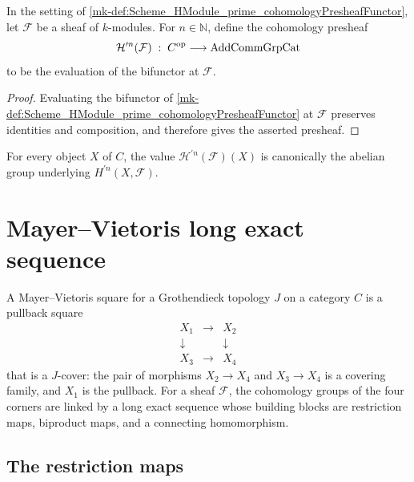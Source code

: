 \begin{definition}\label{mk-def:Scheme_HModule_prime_cohomologyPresheaf}
  \leanok


  In the setting of \ref{mk-def:Scheme_HModule_prime_cohomologyPresheafFunctor}, let \(\mathcal F\) be a sheaf of \(k\)-modules. For \(n \in \mathbb N\), define the cohomology presheaf
  \[
    \mathcal H^{\prime n}(\mathcal F) \;:\; C^{\mathrm{op}} \longrightarrow \mathrm{AddCommGrpCat}
  \]
  to be the evaluation of the bifunctor at \(\mathcal F\).
\end{definition}

\begin{proof}
  \leanok

  Evaluating the bifunctor of \ref{mk-def:Scheme_HModule_prime_cohomologyPresheafFunctor} at \(\mathcal F\) preserves identities and composition, and therefore gives the asserted presheaf.
\end{proof}

\begin{remark}
  For every object \(X\) of \(C\), the value \(\mathcal H^{\prime n}(\mathcal F)(X)\) is canonically the abelian group underlying \(H^{\prime n}(X,\mathcal F)\).
\end{remark}

\section{Mayer--Vietoris long exact sequence}
\label{mk-sec:hmodule_prime_mayer_vietoris}

A Mayer--Vietoris square for a Grothendieck topology \(J\) on a category \(C\) is a pullback square
\[
  \begin{array}{ccc}
    X_1 & \longrightarrow & X_2 \\
    \downarrow & & \downarrow \\
    X_3 & \longrightarrow & X_4
  \end{array}
\]
that is a \(J\)-cover: the pair of morphisms \(X_2 \to X_4\) and \(X_3 \to X_4\) is a covering family, and \(X_1\) is the pullback. For a sheaf \(\mathcal F\), the cohomology groups of the four corners are linked by a long exact sequence whose building blocks are restriction maps, biproduct maps, and a connecting homomorphism.

\subsection{The restriction maps}

